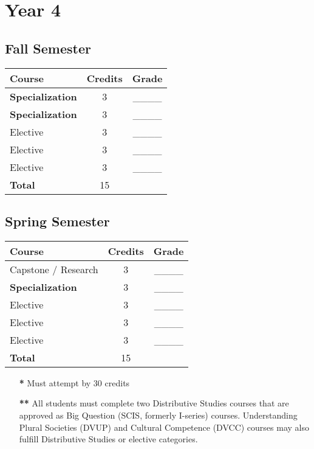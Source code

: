 \section*{Year 4}
\subsection*{Fall Semester}
\begin{tabular}{|l|c|c|}
    \hline
    Course & Credits & Grade \\
    \hline
    \textbf{Specialization} & 3 & \_\_\_\_ \\
    \textbf{Specialization} & 3 & \_\_\_\_ \\    
    Elective & 3 & \_\_\_\_ \\
    Elective & 3 & \_\_\_\_ \\
    Elective & 3 & \_\_\_\_ \\
    \hline
    \textbf{Total} & 15 & \\
    \hline
\end{tabular}

\subsection*{Spring Semester}
\begin{tabular}{|l|c|c|}
    \hline
    Course & Credits & Grade \\
    \hline
    Capstone / Research & 3 & \_\_\_\_ \\    
    \textbf{Specialization} & 3 & \_\_\_\_ \\    
    Elective & 3 & \_\_\_\_ \\
    Elective & 3 & \_\_\_\_ \\
    Elective & 3 & \_\_\_\_ \\
    \hline
    \textbf{Total} & 15 & \\
    \hline
\end{tabular}

\begin{itemize}
\item[\textbf{*}] Must attempt by 30 credits
\item[\textbf{**}] All students must complete two Distributive Studies courses that are approved as Big Question (SCIS, formerly I-series) courses. Understanding Plural Societies (DVUP) and Cultural Competence (DVCC) courses may also fulfill Distributive Studies or elective categories.
\end{itemize}